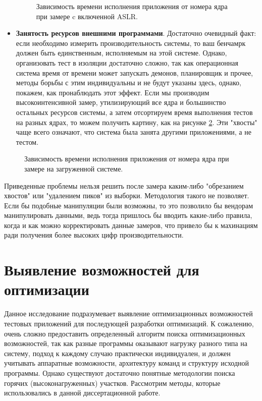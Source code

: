 \begin{itemize}
	\begin{figure}[ht]
		\caption{Зависимость времени исполнения приложения от номера ядра при замере c включенной ASLR.}\label{fig:peaks}
	\end{figure}
	\item \textbf{Занятость ресурсов внешними программами}. Достаточно очевидный факт: если необходимо измерить производительность системы, то ваш бенчамрк должен быть единственным, исполняемым на этой системе.  Однако, организовать тест в изоляции достаточно сложно, так как операционная система время от времени может запускать демонов, планировщик и прочее,  методы борьбы с этим индивидуальны и не будут указаны здесь, однако, покажем, как пронаблюдать этот эффект. Если мы производим высокоинтенсивной замер, утилизирующий все ядра и большинство остальных ресурсов системы, а затем отсортируем время выполнения тестов на разных ядрах, то можем получить картину, как на рисунке \ref{fig:tails}. Эти "хвосты" чаще всего означают, что система была занята другими  приложениями, а не  тестом.
\end{itemize}


\begin{figure}[ht]
	\caption{Зависимость времени исполнения приложения от номера ядра при замере на загруженной системе.}\label{fig:tails}
\end{figure}



Приведенные проблемы нельзя решить после замера каким-либо "обрезанием хвостов" или "удалением пиков" из выборки. Методология такого не позволяет. Если бы подобные манипуляции были возможны, то это позволило бы вендорам манипулировать данными, ведь тогда пришлось бы вводить какие-либо правила, когда и как можно корректировать данные замеров, что привело бы к махинациям ради получения более высоких цифр производительности.

\section {Выявление возможностей для оптимизации}\label{p1:optop}
Данное исследование подразумевает выявление оптимизационных возможностей тестовых приложений для последующей разработки оптимизаций. К сожалению, очень сложно предоставить определенный алгоритм поиска оптимизационных возможностей, так как разные программы оказывают нагрузку разного типа на систему, подход к каждому случаю практически индивидуален, и должен учитывать аппаратные возможности, архитектуру команд и структуру исходной программы. Однако существуют достаточно понятные методологии поиска горячих (высоконагруженных) участков. Рассмотрим методы, которые использовались в данной диссертационной работе.

